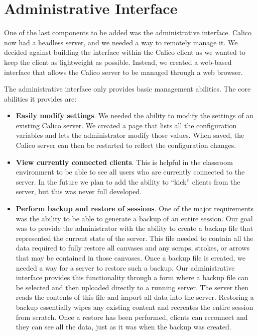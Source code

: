 \section{Administrative Interface}
One of the last components to be added was the administrative interface. Calico now had a headless server, and we needed a way to remotely manage it. We decided against building the interface within the Calico client as we wanted to keep the client as lightweight as possible. 
Instead, we created a web-based interface that allows the Calico server to be managed through a web browser.

The administrative interface only provides basic management abilities. The core abilities it provides are:
\begin{itemize}\itemsep1pt

\item
\textbf{Easily modify settings}.
We needed the ability to modify the settings of an existing Calico server. We created a page that lists all the configuration variables and lets the administrator modify those values. When saved, the Calico server can then be restarted to reflect the configuration changes.

\item
\textbf{View currently connected clients}. 
This is helpful in the classroom environment to be able to see all users who are currently connected to the server. In the future we plan to add the ability to ``kick'' clients from the server, but this was never full developed.

\item
\textbf{Perform backup and restore of sessions}.
One of the major requirements was the ability to be able to generate a backup of an entire session. Our goal was to provide the administrator with the ability to create a backup file that represented the current state of the server. This file needed to contain all the data required to fully restore all canvases and any scraps, strokes, or arrows that may be contained in those canvases. Once a backup file is created, we needed a way for a server to restore such a backup. Our administrative interface provides this functionality through a form where a backup file can be selected and then uploaded directly to a running server. The server then reads the contents of this file and import all data into the server. Restoring a backup essentially wipes any existing content and recreates the entire session from scratch. Once a restore has been performed, clients can reconnect and they can see all the data, just as it was when the backup was created.

\end{itemize}

